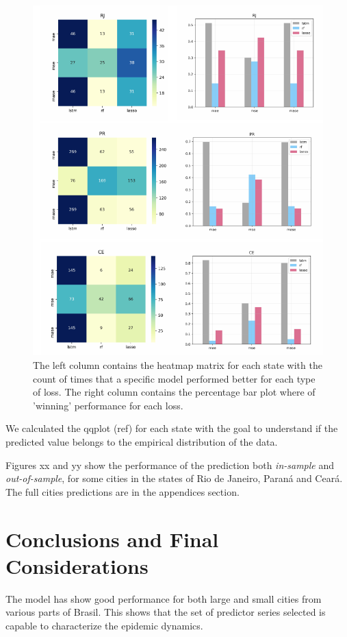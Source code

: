 \documentclass[12pt]{report}
\begin{document}
\begin{figure}[!ht]
\centering
\includegraphics[width=\textwidth]{loss_count.pdf}
\caption{The left column contains the heatmap matrix for each state with the count of times that a specific model performed better for each type of loss. The right column contains the percentage bar plot where of 'winning' performance for each loss.} 
\label{fig:losses_heat}
\end{figure}

We calculated the qqplot (ref) for each state with the goal to understand if the predicted value belongs to the empirical distribution of the data. 

Figures xx and yy show the performance of the prediction  both \emph{in-sample} and  \emph{out-of-sample}, for some cities in the states of Rio de Janeiro, Paraná and Ceará. The full cities predictions are in the appendices section.


\newpage
\chapter{Conclusions and Final Considerations}
The model has show good performance for both large and small cities from various parts of Brasil. This shows that the set of predictor series selected is capable to characterize the epidemic dynamics.
\end{document}
